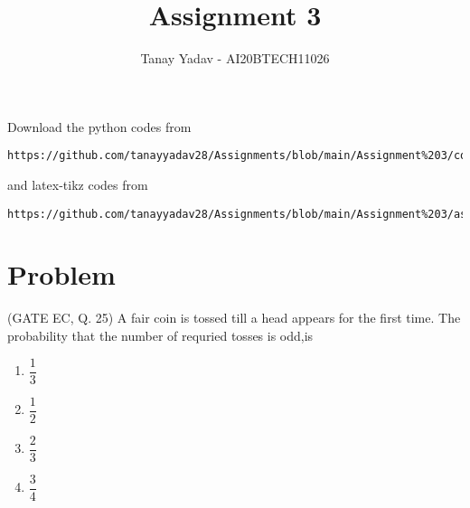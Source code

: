 \documentclass[journal,12pt,twocolumn]{IEEEtran}
\begin{document}
\let\vec\mathbf
\renewcommand{\thefigure}{\theproblem}
\def\putbox#1#2#3{\makebox[0in][l]{\makebox[#1][l]{}\raisebox{\baselineskip}[0in][0in]{\raisebox{#2}[0in][0in]{#3}}}}
     \def\rightbox#1{\makebox[0in][r]{#1}}
     \def\centbox#1{\makebox[0in]{#1}}
     \def\topbox#1{\raisebox{-\baselineskip}[0in][0in]{#1}}
     \def\midbox#1{\raisebox{-0.5\baselineskip}[0in][0in]{#1}}
\vspace{3cm}
\title{Assignment 3}
\author{Tanay Yadav - AI20BTECH11026}
\maketitle
\newpage
\bigskip
\renewcommand{\thefigure}{\theenumi}
\renewcommand{\thetable}{\theenumi}
Download the python codes from 
\begin{lstlisting}
https://github.com/tanayyadav28/Assignments/blob/main/Assignment%203/code/assignment3.py
\end{lstlisting}
%
and latex-tikz codes from 
%
\begin{lstlisting}
https://github.com/tanayyadav28/Assignments/blob/main/Assignment%203/assignment3.tex
\end{lstlisting}
\section{Problem}
(GATE EC, Q. 25) A fair coin is tossed till a head appears for the first time. The probability that the number of requried tosses is odd,is\\
\begin{enumerate}
    \item $\dfrac{1}{3}$\\
    \item $\dfrac{1}{2}$\\
    \item $\dfrac{2}{3}$\\
    \item $\dfrac{3}{4}$
\end{enumerate}
\end{document}
